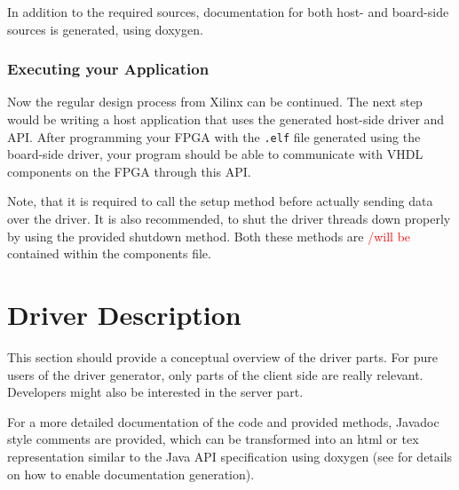 \documentclass{report}
\begin{document}
In addition to the required sources, documentation for both host- and board-side sources is generated, using doxygen.

\subsection{Executing your Application}
Now the regular design process from Xilinx can be continued. The next step would be writing a host application that uses the generated host-side driver and API. After programming your FPGA with the \texttt{.elf} file generated using the board-side driver, your program should be able to communicate with VHDL components on the FPGA through this API.

Note, that it is required to call the setup method before actually sending data over the driver. It is also recommended, to shut the driver threads down properly by using the provided shutdown method. Both these methods are \textcolor{red}{/will be} contained within the components file.

\chapter{Driver Description}
This section should provide a conceptual overview of the driver parts. For pure users of the driver generator, only parts of the client side are really relevant. Developers might also be interested in the server part.

For a more detailed documentation of the code and provided methods, Javadoc style comments are provided, which can be transformed into an html or tex representation similar to the Java API specification using doxygen (see  for details on how to enable documentation generation).
\end{document}
